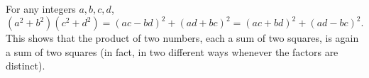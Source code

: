 For any integers $a, b, c, d$,
$$(a^2 + b^2)(c^2 + d^2) = (ac - bd)^2 + (ad + bc)^2 = (ac + bd)^2 + (ad - bc)^2.$$
This shows that the product of two numbers, each a sum of two squares, is again a sum of two squares (in fact, in two different ways whenever the factors are distinct).
